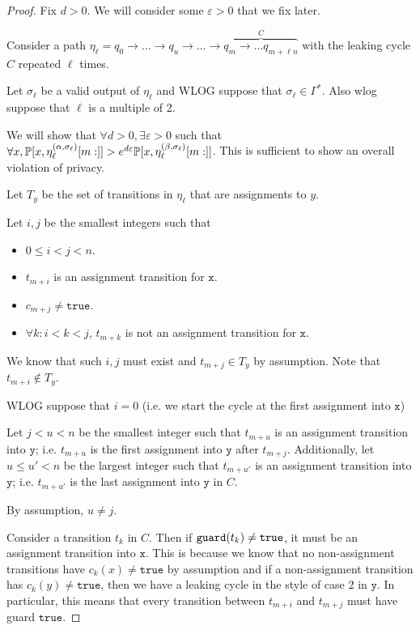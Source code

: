 \begin{proof}
	Fix $d>0$. We will consider some $\varepsilon>0$ that we fix later. 

	Consider a path $\eta_\ell = q_0\to\ldots\to q_u\to \ldots\to \overbrace{q_m\to \ldots q_{m+\ell n}}^{C}$ with the leaking cycle $C$ repeated $\ell$ times.

	Let $\sigma_\ell$ be a valid output of $\eta_\ell$ and WLOG suppose that $\sigma_\ell\in\Gamma^*$. Also wlog suppose that $\ell$ is a multiple of 2. 

	We will show that $\forall d>0, \exists \varepsilon>0$ such that $\forall x, \mathbb{P}[x, \eta_\ell^{(\alpha, \sigma_\ell)}[m:]]>e^{d\varepsilon} \mathbb{P}[x, \eta_\ell^{(\beta, \sigma_\ell)}[m:]]$. This is sufficient to show an overall violation of privacy. 

	Let $T_y$ be the set of transitions in $\eta_\ell$ that are assignments to $y$. 

	Let $i, j$ be the smallest integers such that \begin{itemize}
		\item $0\leq i <j<n$.
		\item $t_{m+i}$ is an assignment transition for $\texttt{x}$.
		\item $c_{m+j}\neq \texttt{true}$.
		\item $\forall k:i<k<j$, $t_{m+k}$ is not an assignment transition for $\texttt{x}$.
	\end{itemize}

	We know that such $i, j$ must exist and $t_{m+j}\in T_y$ by assumption. Note that $t_{m+i}\notin T_y$. 

	WLOG suppose that $i=0$ (i.e. we start the cycle at the first assignment into $\texttt{x}$)

	Let $j<u <n$ be the smallest integer such that $t_{m+u}$ is an assignment transition into $\texttt{y}$; i.e. $t_{m+u}$ is the first assignment into $\texttt{y}$ after $t_{m+j}$. Additionally, let $u\leq u'<n$ be the largest integer such that $t_{m+u'}$ is an assignment transition into $\texttt{y}$; i.e. $t_{m+u'}$ is the last assignment into $\texttt{y}$ in $C$. 

	By assumption, $u \neq j$.
	
	Consider a transition $t_k$ in $C$. Then if $\texttt{guard}(t_k)\neq \texttt{true}$, it must be an assignment transition into $\texttt{x}$. This is because we know that no non-assignment transitions have $c_k(x) \neq \texttt{true}$ by assumption and if a non-assignment transition has $c_k(y) \neq \texttt{true}$, then we have a leaking cycle in the style of case 2 in $\texttt{y}$. In particular, this means that every transition between $t_{m+i}$ and $t_{m+j}$ must have guard $\texttt{true}$.
	

\end{proof}
